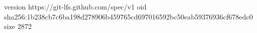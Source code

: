 version https://git-lfs.github.com/spec/v1
oid sha256:1b238cb7c6ba198d278906b459765cd697016592bc50eab59376936cf678edc0
size 2872
